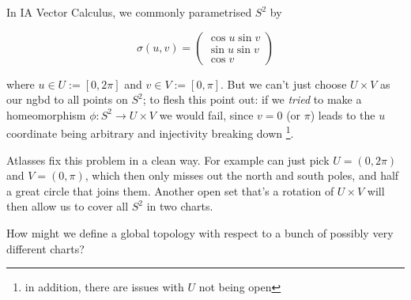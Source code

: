 \documentclass[11pt]{scrartcl}
\begin{document}
\begin{example}

In IA Vector Calculus, we commonly parametrised $S^2$ by

\begin{equation}
    \sigma(u, v) = \begin{pmatrix}\cos u \sin v\\ \sin u \sin v\\ \cos v \end{pmatrix}
\end{equation}

where $u \in U := [0, 2 \pi]$ and $v \in V := [0, \pi]$. But we can't just choose $U \times V$ as our ngbd to all points on $S^2$; to flesh this point out: if we \textit{tried} to make a homeomorphism $\phi : S^2 \rightarrow U \times V$ we would fail, since $v = 0$ (or $\pi$) leads to the $u$ coordinate being arbitrary and injectivity breaking down \footnote{in addition, there are issues with $U$ not being open}.

Atlasses fix this problem in a clean way. For example can just pick $U = (0, 2 \pi)$ and $V = (0, \pi)$, which then only misses out the north and south poles, and half a great circle that joins them. Another open set that's a rotation of $U \times V$ will then allow us to cover all $S^2$ in two charts.
\end{example}

How might we define a global topology with respect to a bunch of possibly very different charts?
\end{document}
